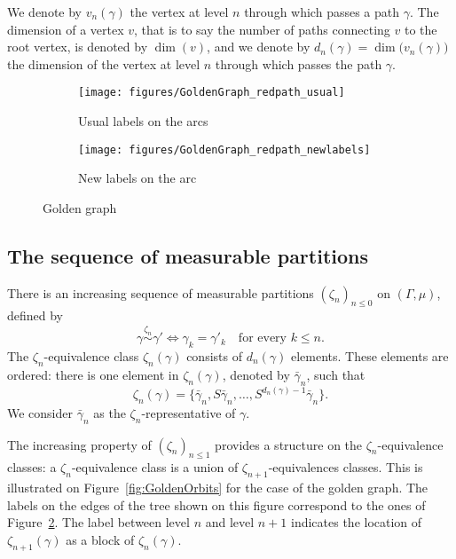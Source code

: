 \documentclass[12pt,a4paper]{article}
\begin{document}
We denote by $v_n(\gamma)$ the vertex at level $n$ through which passes a path $\gamma$. 
The dimension of a vertex $v$, that is to say the number of paths connecting $v$ 
to the root vertex, is denoted by $\dim(v)$, and we denote by 
$\boxed{d_n(\gamma)=\dim\bigl(v_n(\gamma)\bigr)}$ the dimension of the vertex at level $n$ 
through which passes the path $\gamma$. 


\begin{figure}[!h]
   \centering
   \begin{subfigure}[t]{0.37\textwidth}
   \centering
   	\texttt{[image: figures/GoldenGraph\_redpath\_usual]}
 		\caption{\footnotesize Usual labels on the arcs}\label{fig:GoldenGraph}
    \end{subfigure}              
   \quad
    \begin{subfigure}[t]{0.37\textwidth}
    \centering
   	\texttt{[image: figures/GoldenGraph\_redpath\_newlabels]}
 		\caption{\footnotesize New labels on the arc}\label{fig:GoldenGraph_newlabs}
 	\end{subfigure}      
   \caption{Golden graph}
   \label{fig:ostro}
 \end{figure}


\subsection{The sequence of measurable partitions}

There is an increasing sequence of measurable partitions ${(\zeta_n)}_{n \leq 0}$ 
on $(\Gamma, \mu)$, defined by 
$$
\boxed{\gamma \overset{\zeta_n}{\sim} \gamma' 
\iff \gamma_k=\gamma'_k \quad\text{for every $k \leq n$}}.
$$ 
The $\zeta_n$-equivalence class $\zeta_n(\gamma)$ consists of $d_n(\gamma)$ elements. 
These elements are ordered: there is one element in $\zeta_n(\gamma)$, denoted by 
$\bar\gamma_n$, such that 
$$
\boxed{\zeta_n(\gamma)= \{\bar\gamma_n, S\bar\gamma_n, \ldots, S^{d_n(\gamma)-1}\bar\gamma_n\}}.
$$
We consider $\bar\gamma_n$ as the $\zeta_n$-representative of $\gamma$.



The increasing property of ${(\zeta_n)}_{n \leq 1}$ provides a structure 
on the $\zeta_{n}$-equivalence classes: a $\zeta_n$-equivalence class 
is a union of $\zeta_{n+1}$-equivalences classes. 
This is illustrated on Figure~\ref{fig:GoldenOrbits} for the case of the golden graph. 
The labels on the edges of the tree shown on this figure correspond to the ones of Figure~\ref{fig:GoldenGraph_newlabs}. 
The label between level $n$ and level $n+1$ indicates the location of 
$\zeta_{n+1}(\gamma)$ as a block of $\zeta_n(\gamma)$. 
\end{document}
